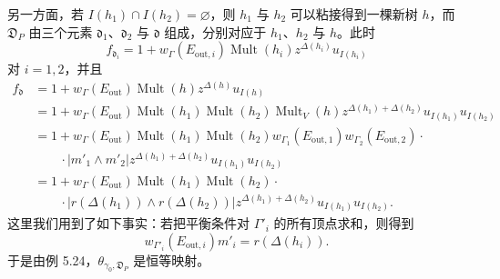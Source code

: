 
另一方面，若 $I(h_1)\cap I(h_2)=\varnothing$，则 $h_1$ 与 $h_2$ 可以粘接得到一棵新树 $h$，而
$\mathfrak D_P$ 由三个元素 $\mathfrak d_1$、$\mathfrak d_2$ 与 $\mathfrak d$ 组成，分别对应于 $h_1$、$h_2$
与 $h$。此时
\[
f_{\mathfrak d_i} = 1 + w_\Gamma(E_{\mathrm{out},i})\operatorname{Mult}(h_i)z^{\Delta(h_i)}u_{I(h_i)}
\]
对 $i=1,2$，并且
\begin{align*}
f_{\mathfrak d} &= 1+w_\Gamma(E_{\mathrm{out}})\operatorname{Mult}(h)z^{\Delta(h)}u_{I(h)}\\
&= 1+w_\Gamma(E_{\mathrm{out}})\operatorname{Mult}(h_1)\operatorname{Mult}(h_2)\operatorname{Mult}_V(h)
  z^{\Delta(h_1)+\Delta(h_2)}u_{I(h_1)}u_{I(h_2)}\\
&= 1+w_\Gamma(E_{\mathrm{out}})\operatorname{Mult}(h_1)\operatorname{Mult}(h_2)
  w_{\Gamma_1}(E_{\mathrm{out},1})w_{\Gamma_2}(E_{\mathrm{out},2})\cdot\\
&\qquad\cdot |m'_1\wedge m'_2|z^{\Delta(h_1)+\Delta(h_2)}u_{I(h_1)}u_{I(h_2)}\\
&= 1+w_\Gamma(E_{\mathrm{out}})\operatorname{Mult}(h_1)\operatorname{Mult}(h_2)\cdot\\
&\qquad\cdot |r(\Delta(h_1))\wedge r(\Delta(h_2))|z^{\Delta(h_1)+\Delta(h_2)}u_{I(h_1)}u_{I(h_2)}.
\end{align*}
这里我们用到了如下事实：若把平衡条件对 $\Gamma'_i$ 的所有顶点求和，则得到
\[
w_{\Gamma'_i}(E_{\mathrm{out},i})m'_i = r(\Delta(h_i)).
\]
于是由例 5.24，$\theta_{\gamma_0,\mathfrak D_P}$ 是恒等映射。


